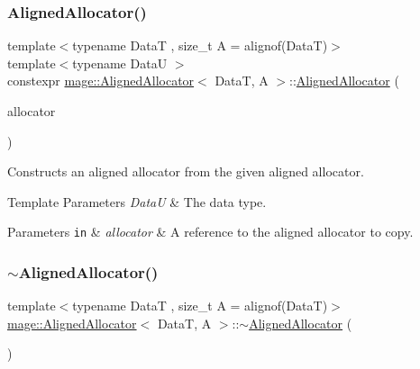 \subsubsection{\texorpdfstring{Aligned\+Allocator()}{AlignedAllocator()}\hspace{0.1cm}{\footnotesize\ttfamily [4/4]}}
{\footnotesize\ttfamily template$<$typename DataT , size\+\_\+t A = alignof(\+Data\+T)$>$ \\
template$<$typename DataU $>$ \\
constexpr \mbox{\hyperlink{classmage_1_1_aligned_allocator}{mage\+::\+Aligned\+Allocator}}$<$ DataT, A $>$\+::\mbox{\hyperlink{classmage_1_1_aligned_allocator}{Aligned\+Allocator}} (\begin{DoxyParamCaption}\item[{\mbox{[}\mbox{[}maybe\+\_\+unused\mbox{]} \mbox{]} const \mbox{\hyperlink{classmage_1_1_aligned_allocator}{Aligned\+Allocator}}$<$ DataU, A $>$ \&}]{allocator }\end{DoxyParamCaption})\hspace{0.3cm}{\ttfamily [noexcept]}}

Constructs an aligned allocator from the given aligned allocator.


\begin{DoxyTemplParams}{Template Parameters}
{\em DataU} & The data type. \\
\hline
\end{DoxyTemplParams}

\begin{DoxyParams}[1]{Parameters}
\mbox{\tt in}  & {\em allocator} & A reference to the aligned allocator to copy. \\
\hline
\end{DoxyParams}
\mbox{\label{classmage_1_1_aligned_allocator_a58be008401a5bde96845cb44daaabca0}} 
\subsubsection{\texorpdfstring{$\sim$\+Aligned\+Allocator()}{~AlignedAllocator()}}
{\footnotesize\ttfamily template$<$typename DataT , size\+\_\+t A = alignof(\+Data\+T)$>$ \\
\mbox{\hyperlink{classmage_1_1_aligned_allocator}{mage\+::\+Aligned\+Allocator}}$<$ DataT, A $>$\+::$\sim$\mbox{\hyperlink{classmage_1_1_aligned_allocator}{Aligned\+Allocator}} (\begin{DoxyParamCaption}{ }\end{DoxyParamCaption})\hspace{0.3cm}{\ttfamily [default]}}

